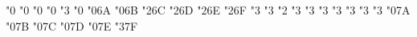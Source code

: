 \mathchardef \Finv   "0
\mathchardef \Game   "0
\mathchardef \mho   "0
\mathchardef \eth   "0
\mathchardef \eqsim   "3
\mathchardef \beth   "0
\mathchardef \gimel   "0\amsbfam 6A
\mathchardef \daleth   "0\amsbfam 6B
\mathchardef \lessdot   "2\amsbfam 6C
\mathchardef \gtrdot   "2\amsbfam 6D
\mathchardef \ltimes   "2\amsbfam 6E
\mathchardef \rtimes   "2\amsbfam 6F
\mathchardef \shortmid   "3
\mathchardef \shortparallel   "3
\mathchardef \smallsetminus   "2
\mathchardef \thicksim   "3
\mathchardef \thickapprox   "3
\mathchardef \approxeq   "3
\mathchardef \precapprox   "3
\mathchardef \succapprox   "3
\mathchardef \curvearrowleft   "3
\mathchardef \curvearrowright   "3
\mathchardef \digamma   "0\amsbfam 7A
\mathchardef \varkappa   "0\amsbfam 7B
\mathchardef \Bbbk   "0\amsbfam 7C
\mathchardef \hslash   "0\amsbfam 7D
\mathchardef \hbar   "0\amsbfam 7E
\mathchardef \backepsilon   "3\amsbfam 7F


